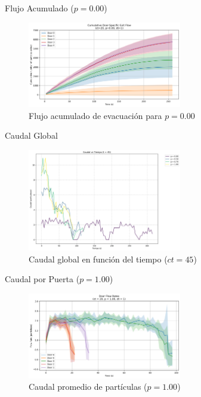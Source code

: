\documentclass[aspectratio=169]{beamer}
\begin{document}
\begin{frame}{Flujo Acumulado ($p=0.00$)}
    \begin{figure}
        \centering
        \includegraphics[width=0.6\textwidth]{img/cumulative_door_flows_t_20_&_p_0.00.png}
        \caption{Flujo acumulado de evacuación para $p=0.00$}
    \end{figure}
\end{frame}

\begin{frame}{Caudal Global}
    \begin{figure}
        \centering
        \includegraphics[width=0.6\textwidth]{img/caudal_vs_time_t45.png}
        \caption{Caudal global en función del tiempo ($ct=45$)}
    \end{figure}
\end{frame}

\begin{frame}{Caudal por Puerta ($p=1.00$)}
    \begin{figure}
        \centering
        \includegraphics[width=0.6\textwidth]{img/door_flow_rates_t_20_&_p_1.00.png}
        \caption{Caudal promedio de partículas ($p=1.00$)}
    \end{figure}
\end{frame}
\end{document}
